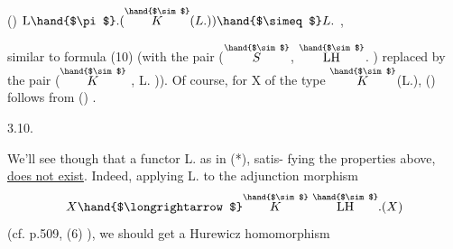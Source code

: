 () \qquad $\mathrm{L}\hand{$\pi$}.(\overset{\hand{$\sim$}}{K}(L.)) \hand{$\simeq$} L.$ \quad {} ,

similar to formula (10)  (with the pair  ($\overset{\hand{$\sim$}}{S}$, $\overset{\hand{$\sim$}}{\mathrm{LH}}$. )  replaced by the pair
($\overset{\hand{$\sim$}}{K}$ , L\hand{$\pi$}. )).  Of course,  for X of the type $\overset{\hand{$\sim$}}{K}$(L.),  () follows from
() .

3.10.

 We'll see though that a functor  L\hand{$\pi$}.  \xout{\unsure{(*)}} as in (*),  satis-%
fying the properties above,  \uline{does not exist}.  Indeed,  applying L\hand{$\pi$}. to
the adjunction morphism
\[ X \hand{$\longrightarrow$} \overset{\hand{$\sim$}}{K}\ \overset{\hand{$\sim$}}{\mathrm{LH}}.(X) \]
(cf. p.509, (6) ), we should get a Hurewicz  homomorphism

